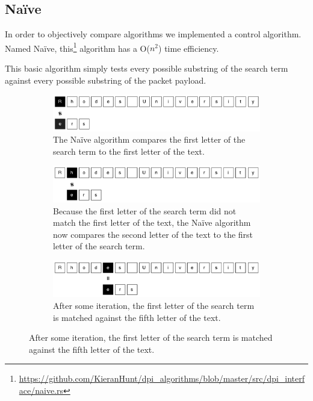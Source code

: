 \documentclass{article}
\begin{document}
\subsection{Na{\"i}ve}
In order to objectively compare algorithms we implemented a control algorithm. Named Na{\"i}ve, this\footnote{\url{https://github.com/KieranHunt/dpi_algorithms/blob/master/src/dpi_interface/naive.rs}} algorithm has a O(\(n^2\)) time efficiency.

This basic algorithm simply tests every possible substring of the search term against every possible substring of the packet payload.

\begin{figure}[hbt]
  \label{naive}
  \centering
  
  \begin{subfigure}{\textwidth}
  \makeatletter
  \includegraphics[width=\textwidth]{images/naive-1}
  \caption{The Na{\"i}ve algorithm compares the first letter of the search term to the first letter of the text.}
  \end{subfigure}
  
  \begin{subfigure}{\textwidth}
  \makeatletter
  \includegraphics[width=\textwidth]{images/naive-2}
  \caption{Because the first letter of the search term did not match the first letter of the text, the Na{\"i}ve algorithm now compares the second letter of the text to the first letter of the search term.}
  \end{subfigure}
  
  \begin{subfigure}{\textwidth}
  \makeatletter
  \includegraphics[width=\textwidth]{images/naive-3}
  \caption{After some iteration, the first letter of the search term is matched against the fifth letter of the text.}
  \end{subfigure}
  

\end{figure}
\end{document}
